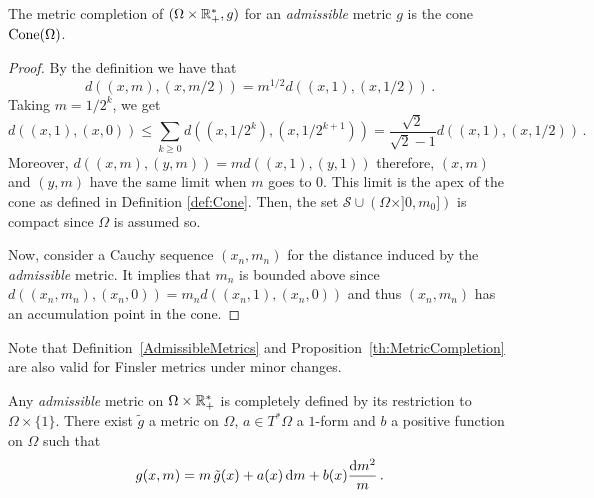 \begin{proposition}\label{th:MetricCompletion}
The metric completion of $(\Omega \times \mathbb{R}_+^*,g)$ for an \textit{admissible} metric $g$ is the cone 
$\operatorname{Cone}(\Omega)$.
\end{proposition}
\begin{proof}
By the definition we have that $$d((x,m),(x,m/2))= m^{1/2}d((x,1),(x,1/2))\,.$$ Taking $m=1/2^k$, we get
\begin{equation}
d((x,1),(x,0)) \leq  \sum_{k \geq 0} d((x,1/2^k),(x,1/2^{k+1})) = \frac{\sqrt{2}}{\sqrt{2} - 1} d((x,1),(x,1/2))\,.
\end{equation}
Moreover, $d((x,m),(y,m)) = md((x,1),(y,1))$ therefore, $(x,m)$ and $(y,m)$ have the same limit when $m$ goes to $0$. This limit is the apex of the cone as defined in Definition \ref{def:Cone}. Then, the set $\mathcal{S} \cup \left(\Omega \times ]0,m_0]\right)$ is compact since $\Omega$ is assumed so.


Now, consider a Cauchy sequence $(x_n,m_n)$ for the distance induced by the \textit{admissible} metric. It implies that $m_n$ is bounded above since $d((x_n,m_n),(x_n,0)) = m_nd((x_n,1),(x_n,0))$ and thus $(x_n,m_n)$ has an accumulation point in the cone.
\end{proof}

\begin{remark}
Note that Definition~\ref{AdmissibleMetrics} and Proposition~\ref{th:MetricCompletion} are also valid for Finsler metrics under minor changes.
\end{remark}



\begin{proposition}
Any \textit{admissible} metric on $\Omega \times \mathbb{R}_+^*$ is completely defined by its restriction to $\Omega \times \{1 \}$. There exist $\tilde{g}$ a metric on $\Omega$, $a \in T^*\Omega$ a $1$-form and $b$ a positive function on $\Omega$ such that
\begin{equation}\label{GeneralFormOfMetric}
g(x,m) = m \, \tilde{g}(x) + a(x) \, \mathrm{d} m + b(x) \frac{\mathrm{d} m^2}{m}\,.
\end{equation}
\end{proposition}

